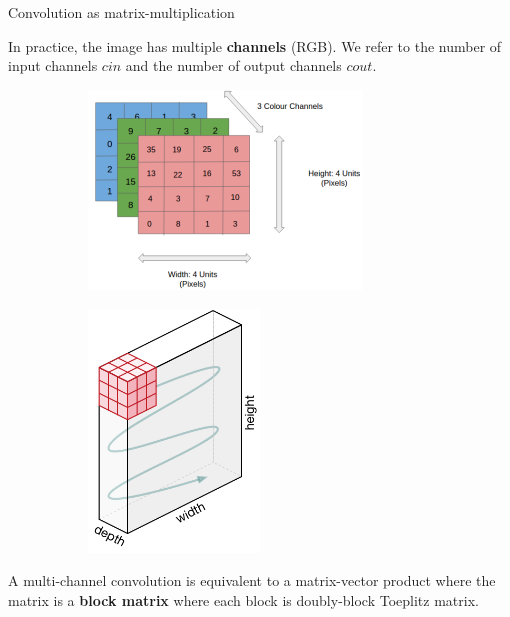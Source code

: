 \begin{frame}{Convolution as matrix-multiplication}
  

  In practice, the image has multiple \textbf{channels} (\eg RGB). We refer to the number of input channels $cin$ and the number of output channels $cout$.

  \begin{figure}
    \begin{subfigure}[t]{0.49\textwidth}
      \centering
      \includegraphics[width=0.8\textwidth]{images/image_rgb.png}
      \caption*{}
    \end{subfigure}
    \begin{subfigure}[t]{0.45\textwidth}
      \centering
      \includegraphics[width=0.5\textwidth]{images/conv_2d.png}
      \caption*{}
    \end{subfigure}
  \end{figure}

  A multi-channel convolution is equivalent to a matrix-vector product where the matrix is a \textbf{block matrix} where each block is doubly-block Toeplitz matrix. 

\end{frame}


